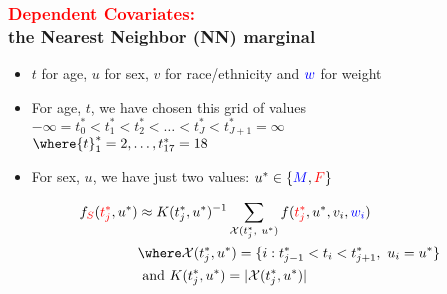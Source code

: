 \documentclass[11pt,dvipsnames,usenames,times]{beamer}
\newcommand*{\red}[1]{\textcolor{red}{#1}}%
\newcommand*{\blue}[1]{\textcolor{blue}{#1}}%
\begin{document}
\begin{frame}\frametitle{\bf%
\textcolor{red}{Dependent Covariates:}\\
 the Nearest Neighbor (NN) marginal}

\begin{itemize}
\item $t$ for age, $u$ for sex, $v$ for race/ethnicity and $\blue{w}$
  for weight
\item For age, $t$, we have chosen this grid of values\\
$-\infty={t}^*_{0} < {t}^*_{1} < {t}^*_{2} < \dots < 
{t}^*_{J} < {t}^*_{J+1}=\infty$ \\
$\where {t}^*_{1}=2, \dots, {t}^*_{17}=18$ \\
\item For sex, $u$, we have just two values: 
${u}^* \in \{\blue{M}, \red{F}\}$ 
\end{itemize}
\begin{align*}
f_{\textcolor{red}{S}}(\red{{t}^*_j}, {u}^*)
& \approx K({t}^*_j, {u}^*)^{-1} \sum_{\mathcal{X}({t}^*_j,\ {u}^*)}
f(\textcolor{red}{{t}^*_j}, {u}^*, {v}_{i}, \blue{{w}_{i}}) \\
& \where \mathcal{X}({{t}^*_j, {u}^*})=\{i: {t}^*_{j-1} <t_{i} < {t}^*_{j+1},\ u_i={u}^*\} \\
& \mbox{\ and\ } K({t}^*_j, {u}^*)=|\mathcal{X}({{t}^*_j, {u}^*})|
\end{align*}
\end{frame}
\end{document}

